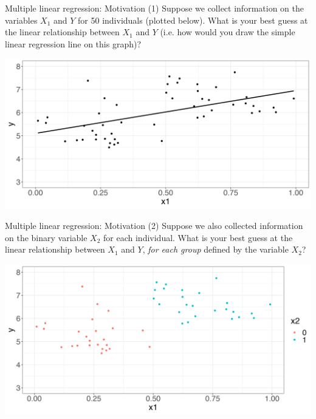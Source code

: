 \documentclass[10pt,t]{beamer}
\begin{document}
\begin{frame}{Multiple linear regression: Motivation}
(1) Suppose we collect information on the variables $X_1$ and $Y$ for 50 individuals (plotted below). What is your best guess at the linear relationship between $X_1$ and $Y$ (i.e. how would you draw the simple linear regression line on this graph)?

\vspace{0.3cm}

\centering \includegraphics[scale=0.3]{multreg2.png}
\end{frame}

\begin{frame}{Multiple linear regression: Motivation}
(2) Suppose we also collected information on the binary variable $X_2$ for each individual. What is your best guess at the linear relationship between $X_1$ and $Y$, \textit{for each group} defined by the variable $X_2$? 

\vspace{0.3cm}

\centering \includegraphics[scale=0.3]{multreg3.png}

\end{frame}
\end{document}
